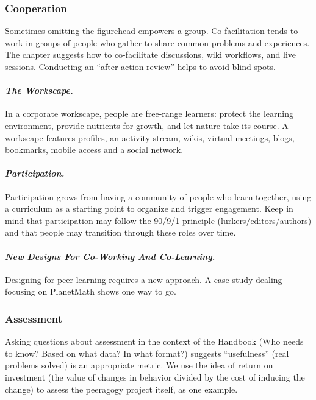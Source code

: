 \subsubsection{Cooperation}

\noindent Sometimes omitting the figurehead empowers a
group. Co-facilitation tends to work in groups of people who gather to
share common problems and experiences. The chapter suggests how to
co-facilitate discussions, wiki workflows, and live
sessions. Conducting an ``after action review'' helps to avoid blind
spots.

\paragraph{\emph{The Workscape.}} In a corporate workscape, people are free-range
learners: protect the learning environment, provide nutrients for
growth, and let nature take its course. A workscape features profiles,
an activity stream, wikis, virtual meetings, blogs, bookmarks, mobile
access and a social network.

\paragraph{\emph{Participation.}} Participation grows from having a
community of people who learn together, using a curriculum as a starting
point to organize and trigger engagement. Keep in mind that
participation may follow the 90/9/1 principle (lurkers/editors/authors)
and that people may transition through these roles over time.

\paragraph{\emph{New Designs For Co-Working And Co-Learning.}} Designing for
peer learning requires a new approach.  A case study dealing focusing
on PlanetMath shows one way to go.

\subsubsection{Assessment}

\noindent Asking questions about assessment in the context of the
Handbook (Who needs to know? Based on what data? In what format?)
suggests ``usefulness'' (real problems solved) is an appropriate
metric. We use the idea of return on investment (the value of changes
in behavior divided by the cost of inducing the change) to assess the
peeragogy project itself, as one example.

